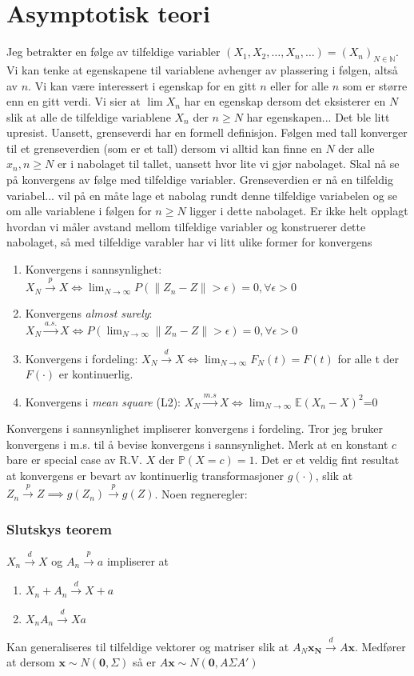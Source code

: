 \section{Asymptotisk teori}
Jeg betrakter en følge av tilfeldige variabler $(X_1,X_2,\dots,X_n,\dots)=(X_n)_{N\in\mathbb{N}}$. Vi kan tenke at egenskapene til variablene avhenger av plassering i følgen, altså av $n$. Vi kan være interessert i egenskap for en gitt $n$ eller for alle $n$ som er større enn en gitt verdi. Vi sier at $\lim X_n$ har en egenskap dersom det eksisterer en $N$ slik at alle de tilfeldige variablene $X_n$ der $n \geq N$ har egenskapen... Det ble litt upresist. Uansett, grenseverdi har en formell definisjon. Følgen med tall konverger til et grenseverdien (som er et tall) dersom vi alltid kan finne en $N$ der alle $x_n, n\geq N$ er i nabolaget til tallet, uansett hvor lite vi gjør nabolaget. Skal nå se på konvergens av følge med tilfeldige variabler. Grenseverdien er nå en tilfeldig variabel... vil på en måte lage et nabolag rundt denne tilfeldige variabelen og se om alle variablene i følgen for $n\geq N$ ligger i dette nabolaget. Er ikke helt opplagt hvordan vi måler avstand mellom tilfeldige variabler og konstruerer dette nabolaget, så med tilfeldige varabler har vi litt ulike former for konvergens
\begin{enumerate}
\item Konvergens i sannsynlighet: $X_N \overset{p}{\rightarrow} X \iff \lim_{N\to\infty}P(\|Z_n-Z\|>\epsilon)=0, \forall \epsilon >0$
\item Konvergens \textit{almost surely}: $X_N \overset{a.s.}{\rightarrow} X \iff P(\lim_{N\to\infty}\|Z_n-Z\|>\epsilon)=0, \forall \epsilon >0$
\item Konvergens i fordeling: $X_N \overset{d}{\rightarrow} X \iff \lim_{N\to\infty}F_N(t)=F(t)$ for alle t der $F(\cdot)$ er kontinuerlig. 
\item Konvergens i \textit{mean square} (L2): $X_N \overset{m.s}{\rightarrow} X \iff \lim_{N\to\infty}\mathbb{E}(X_n-X)^2$=0
\end{enumerate}
Konvergens i sannsynlighet impliserer konvergens i fordeling. Tror jeg bruker konvergens i m.s. til å bevise konvergens i sannsynlighet. Merk at en konstant $c$ bare er special case av R.V. $X$ der $\mathbb{P}(X=c)=1$. Det er et veldig fint resultat at konvergens er bevart av kontinuerlig transformasjoner $g(\cdot)$, slik at $Z_n \overset{p}{\rightarrow} Z \implies  g(Z_n) \overset{p}{\rightarrow} g(Z)$. Noen regneregler:
\subsubsection{Slutskys teorem}
$X_n \overset{d}{\rightarrow}X$ og $A_n\overset{p}{\rightarrow} a$ impliserer at
\begin{enumerate}
\item $X_n + A_n \overset{d}{\rightarrow} X + a$
\item $X_nA_n \overset{d}{\rightarrow} Xa$
\end{enumerate}
Kan generaliseres til tilfeldige vektorer og matriser slik at $A_N\mathbf{x_N} \overset{d}{\rightarrow} A\mathbf{x}$. Medfører at dersom $\mathbf{x} \sim N(\mathbf{0},\Sigma)$ så er $A\mathbf{x} \sim N(\mathbf{0},A\Sigma A')$
